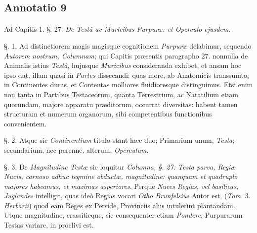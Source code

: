 \documentclass[a4paper, 11pt, oneside, polutonikogreek, german]{article}
\begin{document}
\subsection{Annotatio 9}
\paragraph{}
Ad Capitis 1. §. 27. \emph{De Testâ ac Muricibus Purpuræ: et Operculo ejusdem}.

§. 1. Ad distinctiorem magis magisque cognitionem \emph{Purpuræ} delabimur, sequendo \emph{Autorem nostrum, Columnam}; qui Capitis præsentis paragrapho 27. nonnulla de Animalis istius \emph{Testâ}, hujusque \emph{Muricibus} consideranda exhibet, et ansam hoc ipso dat, illam quasi in \emph{Partes} dissecandi: quas more, ab Anatomicis transsumto, in Continentes duras, et Contentas molliores fluidioresque distinguimus. Etsi enim non tanta in Partibus Testaceorum, quanta Terrestrium, ac Natatilium etiam quorundam, majore apparatu præditorum, occurrat diversitas: habent tamen structuram et numerum organorum, sibi competentibus functionibus convenientem.

§. 2. Atque sic \emph{Continentium} titulo stant hæc duo; Primarium unum, \emph{Testa}; secundarium, nec perenne, alterum, \emph{Operculum}.

§. 3. De \emph{Magnitudine Testæ} sic loquitur \emph{Columna, §. 27: Testa parva, Regiæ Nucis, carnoso adhuc tegmine obductæ, magnitudine: quanquam et quadruplo majores habeamus, et maximas asperiores}. Perque \emph{Nuces Regias, vel basilicas, Juglandes} intelligit, quas ideò Regias vocari \emph{Otho Brunfelsius} Autor est, (\emph{Tom.} 3. \emph{Herbarii}) quod eam Reges ex Perside, Provinciis aliis intulerint plantandam. Utque magnitudine, crassitieque, sic consequenter etiam \emph{Pondere}, Purpurarum Testas variare, in proclivi est.
\end{document}
